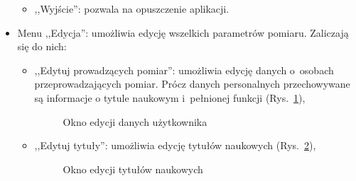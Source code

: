 \begin{itemize}
\begin{itemize}
\item ,,Wyjście'': pozwala na opuszczenie aplikacji.
\end{itemize}

\item Menu ,,Edycja'': umożliwia edycję wszelkich parametrów pomiaru. Zaliczają się do nich:
\begin{itemize}
\item ,,Edytuj prowadzących pomiar'': umożliwia edycję danych o~osobach przeprowadzających pomiar. Prócz danych personalnych przechowywane są informacje o tytule naukowym i~pełnionej funkcji (Rys.~\ref{editUser}),

\begin{figure}[!htb]
\centering 		
  \hspace{2mm}
\caption{Okno edycji danych użytkownika} 	
\label{editUser}
\end{figure}

\item ,,Edytuj tytuły'': umożliwia edycję tytułów naukowych (Rys.~\ref{editTitle}),

\begin{figure}[!htb]
\centering 		
  \hspace{2mm}
\caption{Okno edycji tytułów naukowych} 	
\label{editTitle}
\end{figure}


\end{itemize}
\end{itemize}
